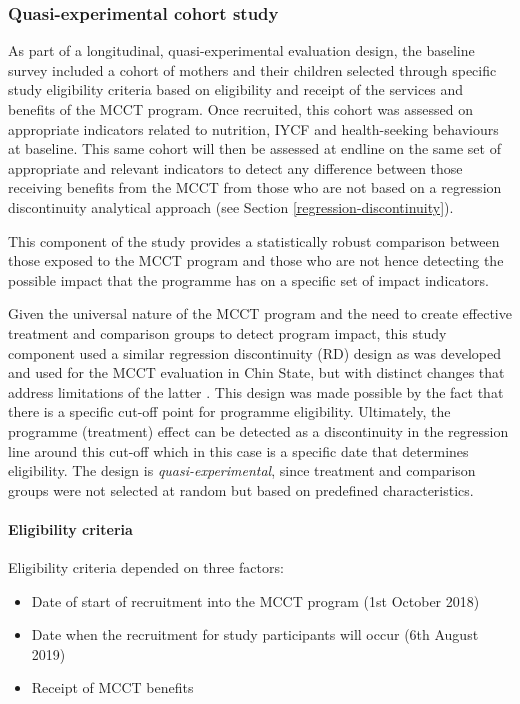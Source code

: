 \documentclass[12pt,a4paper]{article}
\let\oldparagraph\paragraph
\renewcommand{\paragraph}[1]{\oldparagraph{#1}\mbox{}}
\begin{document}
\hypertarget{study2}{%
\subsubsection{Quasi-experimental cohort study}\label{study2}}

As part of a longitudinal, quasi-experimental evaluation design, the baseline survey included a cohort of mothers and their children selected through specific study eligibility criteria based on eligibility and receipt of the services and benefits of the MCCT program. Once recruited, this cohort was assessed on appropriate indicators related to nutrition, IYCF and health-seeking behaviours at baseline. This same cohort will then be assessed at endline on the same set of appropriate and relevant indicators to detect any difference between those receiving benefits from the MCCT from those who are not based on a regression discontinuity analytical approach (see Section \ref{regression-discontinuity}).

This component of the study provides a statistically robust comparison between those exposed to the MCCT program and those who are not hence detecting the possible impact that the programme has on a specific set of impact indicators.

Given the universal nature of the MCCT program and the need to create effective treatment and comparison groups to detect program impact, this study component used a similar regression discontinuity (RD) design as was developed and used for the MCCT evaluation in Chin State, but with distinct changes that address limitations of the latter \citep{MinistryofSocialWelfareReliefandResettlement2018}. This design was made possible by the fact that there is a specific cut-off point for programme eligibility. Ultimately, the programme (treatment) effect can be detected as a discontinuity in the regression line around this cut-off which in this case is a specific date that determines eligibility. The design is \emph{quasi-experimental}, since treatment and comparison groups were not selected at random but based on predefined characteristics.

\hypertarget{eligibility}{%
\paragraph{Eligibility criteria}\label{eligibility}}

Eligibility criteria depended on three factors:

\begin{itemize}
\item
  Date of start of recruitment into the MCCT program (1st October 2018)
\item
  Date when the recruitment for study participants will occur (6th August 2019)
\item
  Receipt of MCCT benefits
\end{itemize}
\end{document}
